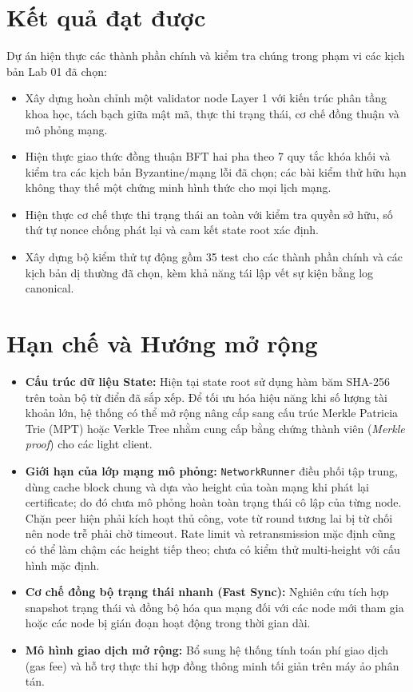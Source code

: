 \documentclass[10pt,a4paper]{report}
\begin{document}
\section{Kết quả đạt được}
Dự án hiện thực các thành phần chính và kiểm tra chúng trong phạm vi các kịch bản Lab 01 đã chọn:
\begin{itemize}
  \item Xây dựng hoàn chỉnh một validator node Layer 1 với kiến trúc phân tầng khoa học, tách bạch giữa mật mã, thực thi trạng thái, cơ chế đồng thuận và mô phỏng mạng.
  \item Hiện thực giao thức đồng thuận BFT hai pha theo 7 quy tắc khóa khối và kiểm tra các kịch bản Byzantine/mạng lỗi đã chọn; các bài kiểm thử hữu hạn không thay thế một chứng minh hình thức cho mọi lịch mạng.
  \item Hiện thực cơ chế thực thi trạng thái an toàn với kiểm tra quyền sở hữu, số thứ tự nonce chống phát lại và cam kết state root xác định.
  \item Xây dựng bộ kiểm thử tự động gồm 35 test cho các thành phần chính và các kịch bản dị thường đã chọn, kèm khả năng tái lập vết sự kiện bằng log canonical.
\end{itemize}

\section{Hạn chế và Hướng mở rộng}
\begin{itemize}
  \item \textbf{Cấu trúc dữ liệu State:} Hiện tại state root sử dụng hàm băm SHA-256 trên toàn bộ từ điển đã sắp xếp. Để tối ưu hóa hiệu năng khi số lượng tài khoản lớn, hệ thống có thể mở rộng nâng cấp sang cấu trúc Merkle Patricia Trie (MPT) hoặc Verkle Tree nhằm cung cấp bằng chứng thành viên (\emph{Merkle proof}) cho các light client.
  \item \textbf{Giới hạn của lớp mạng mô phỏng:} \texttt{NetworkRunner} điều phối tập trung, dùng cache block chung và dựa vào height của toàn mạng khi phát lại certificate; do đó chưa mô phỏng hoàn toàn trạng thái cô lập của từng node. Chặn peer hiện phải kích hoạt thủ công, vote từ round tương lai bị từ chối nên node trễ phải chờ timeout. Rate limit và retransmission mặc định cũng có thể làm chậm các height tiếp theo; chưa có kiểm thử multi-height với cấu hình mặc định.
  \item \textbf{Cơ chế đồng bộ trạng thái nhanh (Fast Sync):} Nghiên cứu tích hợp snapshot trạng thái và đồng bộ hóa qua mạng đối với các node mới tham gia hoặc các node bị gián đoạn hoạt động trong thời gian dài.
  \item \textbf{Mô hình giao dịch mở rộng:} Bổ sung hệ thống tính toán phí giao dịch (gas fee) và hỗ trợ thực thi hợp đồng thông minh tối giản trên máy ảo phân tán.
\end{itemize}
\end{document}
